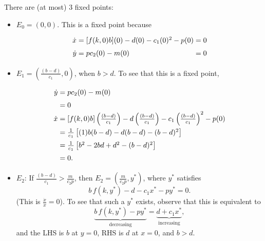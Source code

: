 \documentclass[a5paper]{article}
\theoremstyle{definition}%
\numberwithin{exercise}{section}
\theoremstyle{remark}%
\begin{document}


There are (at most) 3 fixed points:
\begin{itemize}
\item $E_0=(0,0)$. This is a fixed point because
\[\arraycolsep=1.4pt\def\arraystretch{1.5}
\begin{array}{rcll}
\dot{x}&=&[f(k,0)b](0)-d(0)-c_1(0)^2-p(0)&=0\\
\dot{y}&=&pc_2(0)-m(0)&=0
\end{array}\]
\end{itemize}




\begin{itemize}
\item $E_1=\left(\frac{(b-d)}{c_1},0\right)$, when $b>d$. To see that this is a fixed point, 
\[\arraycolsep=1.4pt\def\arraystretch{1.5}
\begin{array}{rcll}
\dot{y}&=&pc_2(0)-m(0)\\
&=&0 \\
\dot{x}&=&[f(k,0)b]\left(\frac{(b-d)}{c_1}\right)-d\left(\frac{(b-d)}{c_1}\right)-c_1\left(\frac{(b-d)}{c_1}\right)^2-p(0)\\
&=&\frac{1}{c_1}\left[(1)b(b-d)-d(b-d)-(b-d)^2\right]\\
&=&\frac{1}{c_1}\left[b^2-2bd+d^2-(b-d)^2\right]\\
&=&0.
\end{array}\]
\end{itemize}




\begin{itemize}
\item $E_2$: If  $\frac{(b-d)}{c_1}>\frac{m}{c_2p}$, then $E_2=\left(\frac{m}{c_2p}, y^*\right)$, where $y^*$ satisfies 
$$b\, f(k,y^*)-d-c_1x^*-py^*=0.$$
(This is $\frac{\dot{x}}{x}=0$). To see that such a $y^*$ exists, observe that this is equivalent to
$$\underbrace{b\, f(k,y^*)-py^*}_{\text{decreasing}}=\underbrace{d+c_1x^*}_{\text{increasing}},$$
and the LHS is $b$ at $y=0$, RHS is $d$ at $x=0$, and $b>d$. 
\end{itemize}
\end{document}
